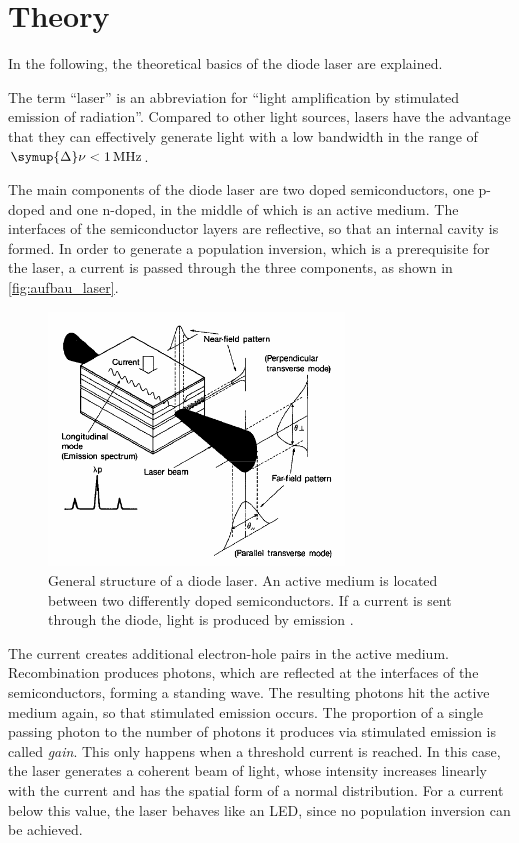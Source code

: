 \section{Theory}
\label{sec:theorie}

In the following, the theoretical basics of the diode laser are explained.

The term \enquote{laser} is an abbreviation for \enquote{light amplification by stimulated emission of radiation}.
Compared to other light sources, lasers have the advantage
that they can effectively generate light with a low bandwidth in the range of $\symup{\Delta}\nu < \SI{1}{\mega\hertz}$.

The main components of the diode laser are two doped semiconductors,
one p-doped and one n-doped,
in the middle of which is an active medium.
The interfaces of the semiconductor layers are reflective,
so that an internal cavity is formed.
In order to generate a population inversion,
which is a prerequisite for the laser,
a current is passed through the three components,
as shown in \autoref{fig:aufbau_laser}.
\begin{figure}
    \centering
    \includegraphics[width=0.7\textwidth]{content/img/p6_Fig2.png}
    \caption{General structure of a diode laser.
    An active medium is located between two differently doped semiconductors.
    If a current is sent through the diode, light is produced by emission \cite{versuchsanleitung}.}
    \label{fig:aufbau_laser}
\end{figure}
The current creates additional electron-hole pairs in the active medium.
Recombination produces photons,
which are reflected at the interfaces of the semiconductors,
forming a standing wave.
The resulting photons hit the active medium again,
so that stimulated emission occurs.
The proportion of
    a single passing photon
    to the number of photons it produces via stimulated emission
is called \emph{gain}.
This only happens when a threshold current is reached.
In this case, the laser generates a coherent beam of light,
whose intensity increases linearly with the current and has the spatial form of a normal distribution.
For a current below this value, the laser behaves like an LED,
since no population inversion can be achieved.

